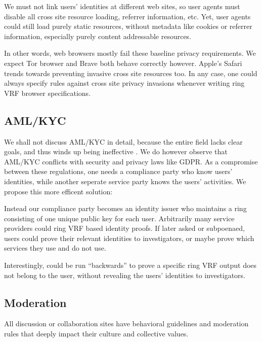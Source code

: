 We must not link users' identities at different web sites, so user agents
must disable all cross site resource loading, referrer information, etc.
Yet, user agents could still load purely static resources, without metadata
like cookies or referrer information, especially purely content addressable
resources.

In other words, web browsers mostly fail these baseline privacy requirements.
We expect Tor browser and Brave both behave correctly however.
Apple's Safari trends towards preventing invasive cross site resources too.  
In any case, one could always specify rules against cross site privacy invasions
whenever writing ring VRF browser specifications.


\subsection{AML/KYC}\label{subsec:AML_KYC}

We shall not discuss AML/KYC in detail, because the entire field lacks
clear goals, and thus winds up being ineffective
 \cite{doi:10.1080/25741292.2020.1725366}.
We do however observe that AML/KYC conflicts with security and privacy
laws like GDPR.  As a compromise between these regulations,
one needs a compliance party who know users' identities,
 while another seperate service party knows the users' activities.
We propose this more efficent solution:

Instead our compliance party becomes an identity issuer who maintains
a ring \ctx consisting of one unique public key for each user.
Arbitrarily many service providers could ring VRF based identity proofs.
If later asked or subpoenaed, users could prove their relevant identities
to investigators, or maybe prove which services they use and do not use. 

Interestingly, \PedVRF could be run ``backwards'' to prove a specific
ring VRF output does not belong to the user, without revealing the users'
identities to investigators. 


\subsection{Moderation}
\label{subsec:moderation}

All discussion or collaboration sites have behavioral guidelines and
moderation rules that deeply impact their culture and collective values.

